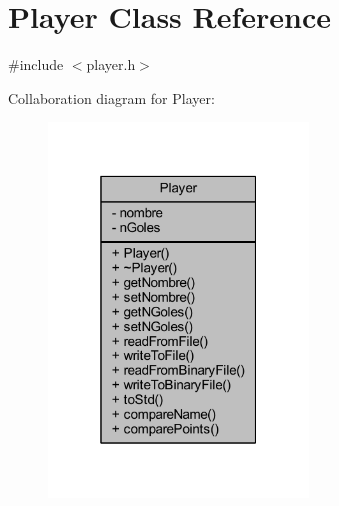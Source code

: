 \hypertarget{class_player}{}\section{Player Class Reference}
\label{class_player}


{\ttfamily \#include $<$player.\+h$>$}



Collaboration diagram for Player\+:\nopagebreak
\begin{figure}[H]
\begin{center}
\leavevmode
\includegraphics[width=196pt]{d6/db3/class_player__coll__graph}
\end{center}
\end{figure}
